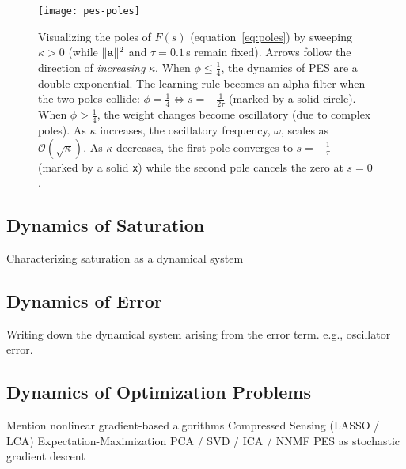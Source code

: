 \begin{figure}
\centering
\texttt{[image: pes-poles]}
\caption{ \label{fig:pes-poles}
  Visualizing the poles of $F(s)$ (equation~\ref{eq:poles}) by sweeping $\kappa > 0$ (while $\| \mathbf{a} \|^2$  and $\tau = 0.1\,$s remain fixed).
  Arrows follow the direction of \emph{increasing} $\kappa$.
  When $\phi \le \frac{1}{4}$, the dynamics of PES are a double-exponential.
  The learning rule becomes an alpha filter when the two poles collide: $\phi = \frac{1}{4} \iff s = -\frac{1}{2\tau}$ (marked by a solid circle).
  When $\phi > \frac{1}{4}$, the weight changes become oscillatory (due to complex poles).
  As $\kappa$ increases, the oscillatory frequency, $\omega$, scales as $\mathcal{O}\left(\sqrt{\kappa}\right)$.
  As $\kappa$ decreases, the first pole converges to $s = -\frac{1}{\tau}$ (marked by a solid \texttt{x}) while the second pole cancels the zero at $s = 0$. %
}
\end{figure}

\subsection{Dynamics of Saturation}

Characterizing saturation as a dynamical system

\subsection{Dynamics of Error}

Writing down the dynamical system arising from the error term. e.g., oscillator error.

\subsection{Dynamics of Optimization Problems}

Mention nonlinear gradient-based algorithms 
 Compressed Sensing (LASSO / LCA)
 Expectation-Maximization
 PCA / SVD / ICA / NNMF
 PES as stochastic gradient descent
